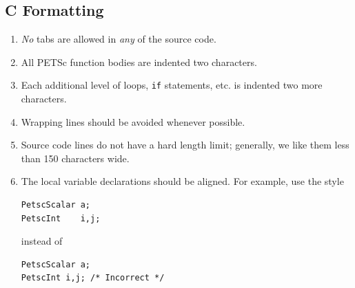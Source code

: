 \subsection{C Formatting}
\begin{enumerate}
\item {\em No} tabs are allowed in {\em any} of the source code.
\item All PETSc function bodies are indented two characters.
\item Each additional level of loops, \lstinline{if} statements, etc. is indented
      two more characters.
\item Wrapping lines should be avoided whenever possible.
\item Source code lines do not have a hard length limit; generally, we like them less than 150 characters wide.
\item The local variable declarations should be aligned. For example,
      use the style
\begin{lstlisting}
PetscScalar a;
PetscInt    i,j;
\end{lstlisting}
instead of
\begin{lstlisting}
PetscScalar a;
PetscInt i,j; /* Incorrect */
\end{lstlisting}


\end{enumerate}
